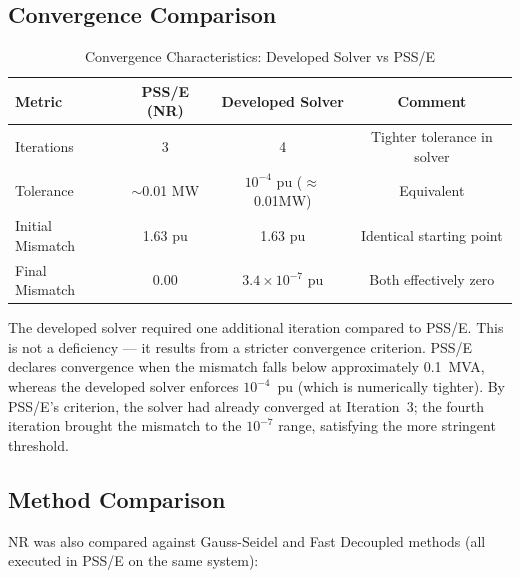 \documentclass[12pt, a4paper]{article}
\begin{document}
\subsection{Convergence Comparison}

\begin{table}[htbp]
\centering
\caption{Convergence Characteristics: Developed Solver vs PSS/E}
\label{tab:convergence}
\begin{tabular}{l c c c}
\toprule
\textbf{Metric} & \textbf{PSS/E (NR)} & \textbf{Developed Solver} & \textbf{Comment} \\
\midrule
Iterations & 3 & 4 & Tighter tolerance in solver \\
Tolerance & $\sim$0.01 MW & $10^{-4}$ pu ($\approx$0.01MW) & Equivalent \\
Initial Mismatch & 1.63 pu & 1.63 pu & Identical starting point \\
Final Mismatch & 0.00 & $3.4 \times 10^{-7}$ pu & Both effectively zero \\
\bottomrule
\end{tabular}
\end{table}

The developed solver required one additional iteration compared to PSS/E. This is not a deficiency --- it results from a stricter convergence criterion. PSS/E declares convergence when the mismatch falls below approximately 0.1~MVA, whereas the developed solver enforces $10^{-4}$~pu (which is numerically tighter). By PSS/E's criterion, the solver had already converged at Iteration~3; the fourth iteration brought the mismatch to the $10^{-7}$ range, satisfying the more stringent threshold.

\subsection{Method Comparison}
NR was also compared against Gauss-Seidel and Fast Decoupled methods (all executed in PSS/E on the same system):

\begin{table}[htbp]
\centering
\caption{Load Flow Method Comparison (PSS/E Results)}
\label{tab:method_comparison}
\end{table}
\end{document}

